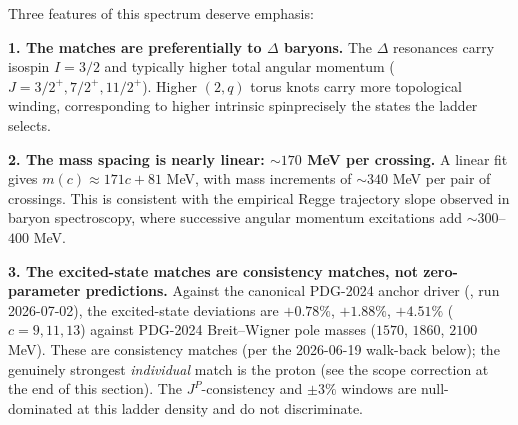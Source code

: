 Three features of this spectrum deserve emphasis:

\textbf{1. The matches are preferentially to $\Delta$ baryons.} The $\Delta$ resonances carry isospin $I = 3/2$ and typically higher total angular momentum ($J = 3/2^+, 7/2^+, 11/2^+$). Higher $(2,q)$ torus knots carry more topological winding, corresponding to higher intrinsic spin\textemdash precisely the states the ladder selects.

\textbf{2. The mass spacing is nearly linear: $\sim 170$ MeV per crossing.} A linear fit gives $m(c) \approx 171c + 81$ MeV, with mass increments of $\sim 340$ MeV per pair of crossings. This is consistent with the empirical Regge trajectory slope observed in baryon spectroscopy, where successive angular momentum excitations add $\sim 300$--$400$ MeV.

\textbf{3. The excited-state matches are consistency matches, not zero-parameter predictions.} Against the canonical PDG-2024 anchor driver (, run 2026-07-02), the excited-state deviations are $+0.78\%$, $+1.88\%$, $+4.51\%$ ($c = 9, 11, 13$) against PDG-2024 Breit--Wigner pole masses ($1570$, $1860$, $2100$ MeV). These are consistency matches (per the 2026-06-19 walk-back below); the genuinely strongest \emph{individual} match is the proton (see the scope correction at the end of this section). The $J^P$-consistency and $\pm 3\%$ windows are null-dominated at this ladder density and do not discriminate.

